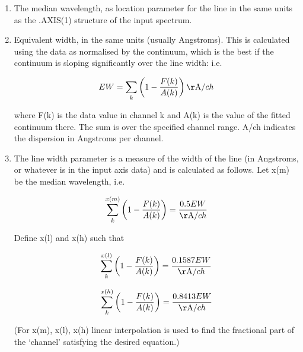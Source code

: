 \documentclass[11pt,twoside]{article}
\begin{document}
\begin{enumerate}
\item
   The median wavelength, as location parameter for the line in the
   same units as the .AXIS(1) structure of the input spectrum.

\item
   Equivalent width, in the same units (usually Angstroms). This is
   calculated using the data as normalised by the continuum, which is
   the best if the continuum is sloping significantly over the line
   width: i.e.

\begin{displaymath}
   EW = \sum_k \left( 1 - {F(k)\over A(k)} \right) {{\rm \AA}/ch}
\end{displaymath}

   where F(k) is the data value in channel k and A(k) is the value
   of the fitted continuum there. The sum is over the specified channel
   range. A/ch indicates the dispersion in Angstroms per
   channel.

\item
   The line width parameter is a measure of the width of the line (in
   Angstroms, or whatever is in the input axis data) and is calculated
   as follows. Let x(m) be the median wavelength, i.e.

\begin{displaymath}
   \sum_k^{x(m)} \left( 1 - {F(k)\over A(k)} \right)
      = {0.5 EW \over {\rm \AA}/ch}
\end{displaymath}

   Define x(l) and x(h) such that

\begin{displaymath}
   \sum_k^{x(l)} \left( 1 - {F(k)\over A(k)} \right)
      = {0.1587 EW \over {\rm \AA}/ch}
\end{displaymath}

\begin{displaymath}
   \sum_k^{x(h)} \left( 1 - {F(k)\over A(k)} \right)
      = {0.8413 EW \over {\rm \AA}/ch}
\end{displaymath}


   (For x(m), x(l), x(h) linear interpolation is used to find the
   fractional part of the `channel' satisfying the desired equation.)


\end{enumerate}
\end{document}
